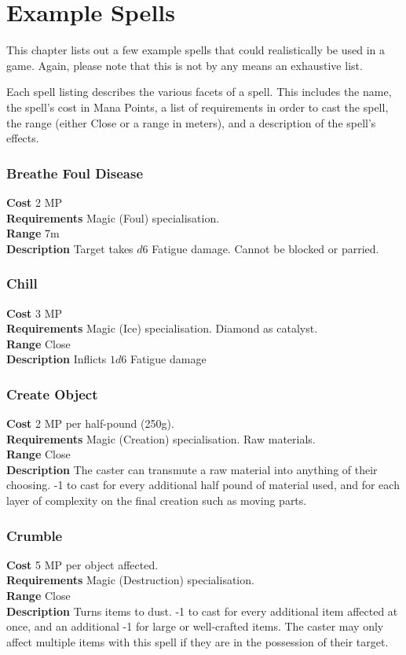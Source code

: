 \chapter{Example Spells}
This chapter lists out a few example spells that could realistically be used in a game.
Again, please note that this is not by any means an exhaustive list.

Each spell listing describes the various facets of a spell. This includes the name,
the spell's cost in Mana Points, a list of requirements in order to cast the spell,
the range (either Close or a range in meters), and a description of the spell's
effects.

\subsection*{Breathe Foul Disease}
\textbf{Cost} 2 MP\\
\textbf{Requirements} Magic (Foul) specialisation. \\
\textbf{Range} 7m \\
\textbf{Description} Target takes $d6$ Fatigue damage. 
Cannot be blocked or parried.

\subsection*{Chill}
\textbf{Cost} 3 MP\\
\textbf{Requirements} Magic (Ice) specialisation. 
Diamond as catalyst. \\
\textbf{Range} Close\\
\textbf{Description} Inflicts $1d6$ Fatigue damage

\subsection*{Create Object}
\textbf{Cost} 2 MP per half-pound (250g).\\
\textbf{Requirements} Magic (Creation) specialisation. Raw materials.\\
\textbf{Range} Close\\
\textbf{Description} The caster can transmute a raw material into anything of their choosing. 
-1 to cast for every additional half pound of material used, and for each layer of complexity on the final creation such as moving parts.

\subsection*{Crumble}
\textbf{Cost} 5 MP per object affected.\\
\textbf{Requirements} Magic (Destruction) specialisation.\\
\textbf{Range} Close\\
\textbf{Description} Turns items to dust. 
-1 to cast for every additional item affected at once, and an additional -1 for large or well-crafted items.
The caster may only affect multiple items with this spell if they are in the possession of their target.

